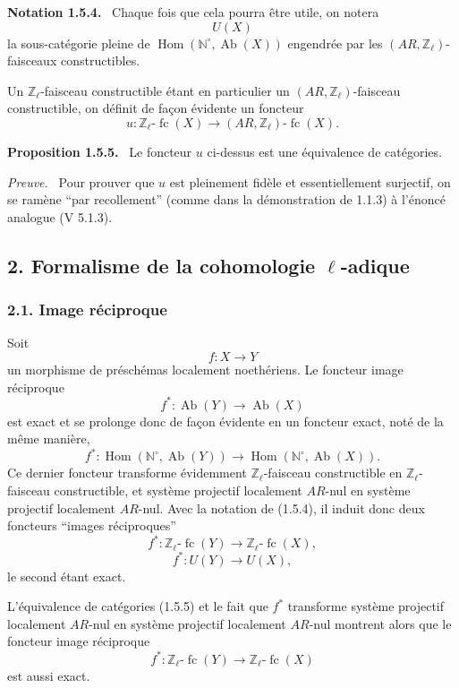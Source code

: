 \documentclass[11pt]{article}
\newenvironment{statement}[1]{\par\medskip\noindent\textbf{#1.}\ }{\par\medskip}
\newenvironment{prooftext}[1][Proof]{\par\noindent\emph{#1.}\ }{\par\medskip}
\DeclareMathOperator{\Hom}{Hom}
\providecommand{\Hom}{\operatorname{Hom}}
\providecommand{\Ab}{\operatorname{Ab}}
\providecommand{\fc}{\operatorname{fc}}
\begin{document}
\begin{statement}{Notation 1.5.4}
Chaque fois que cela pourra être utile, on notera
\[
U(X)
\]
la sous-catégorie pleine de \(\Hom(\mathbb N^\circ,\Ab(X))\) engendrée par les \((AR,\mathbb Z_\ell)\)-faisceaux constructibles.
\end{statement}

Un \(\mathbb Z_\ell\)-faisceau constructible étant en particulier un \((AR,\mathbb Z_\ell)\)-faisceau constructible, on définit de façon évidente un foncteur
\[
u:\mathbb Z_\ell\text{-}\fc(X)\longrightarrow (AR,\mathbb Z_\ell)\text{-}\fc(X).
\]

\begin{statement}{Proposition 1.5.5}
Le foncteur \(u\) ci-dessus est une équivalence de catégories.
\end{statement}

\begin{prooftext}[Preuve]
Pour prouver que \(u\) est pleinement fidèle et essentiellement surjectif, on se ramène ``par recollement'' (comme dans la démonstration de 1.1.3) à l'énoncé analogue (V 5.1.3).
\end{prooftext}

\subsection*{2. Formalisme de la cohomologie \(\ell\)-adique}

\subsubsection*{2.1. Image réciproque}

Soit
\[
f:X\longrightarrow Y
\]
un morphisme de préschémas localement noethériens. Le foncteur image réciproque
\[
f^*:\Ab(Y)\longrightarrow \Ab(X)
\]
est exact et se prolonge donc de façon évidente en un foncteur exact, noté de la même manière,
\[
f^*:\Hom(\mathbb N^\circ,\Ab(Y))\longrightarrow \Hom(\mathbb N^\circ,\Ab(X)).
\]
Ce dernier foncteur transforme évidemment \(\mathbb Z_\ell\)-faisceau constructible en \(\mathbb Z_\ell\)-faisceau constructible, et système projectif localement \(AR\)-nul en système projectif localement \(AR\)-nul. Avec la notation de (1.5.4), il induit donc deux foncteurs ``images réciproques''
\[
f^*:\mathbb Z_\ell\text{-}\fc(Y)\longrightarrow \mathbb Z_\ell\text{-}\fc(X),
\]
\[
f^*:U(Y)\longrightarrow U(X),
\]
le second étant exact.

L'équivalence de catégories (1.5.5) et le fait que \(f^*\) transforme système projectif localement \(AR\)-nul en système projectif localement \(AR\)-nul montrent alors que le foncteur image réciproque
\[
f^*:\mathbb Z_\ell\text{-}\fc(Y)\longrightarrow \mathbb Z_\ell\text{-}\fc(X)
\]
est aussi exact.
\end{document}
